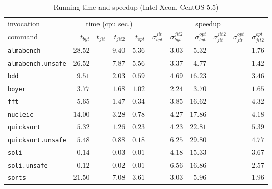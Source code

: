 \documentclass[12pt,a4paper,final]{article}
\begin{document}
\begin{table*}[h]
  \footnotesize
  \centering
  \begin{tabular}{l|rrrr|rrrrrr}
    \multicolumn{1}{l|}{\large invocation}
    & \multicolumn{4}{c|}{{\large time} (cpu sec.)}
    & \multicolumn{6}{c}{\large speedup}
    \\
    command
    & $t_{byt}$ & $t_{jit}$ & $t_{jit2}$ & $t_{opt}$
    & $\sigma^{jit}_{byt}$ & $\sigma^{jit2}_{byt}$ & $\sigma^{opt}_{byt}$
    & $\sigma^{jit2}_{jit}$ & $\sigma^{opt}_{jit}$ & $\sigma^{opt}_{jit2}$
    \\
    \hline
    \texttt{almabench} & $28.52$ &  & $9.40$ & $5.36$ &  & $3.03$ & $5.32$ &  &  & $1.76$\\
    \texttt{almabench.unsafe} & $26.52$ &  & $7.87$ & $5.56$ &  & $3.37$ & $4.77$ &  &  & $1.42$\\
    \texttt{bdd} & $9.51$ &  & $2.03$ & $0.59$ &  & $4.69$ & $16.23$ &  &  & $3.46$\\
    \texttt{boyer} & $3.77$ &  & $1.68$ & $1.02$ &  & $2.24$ & $3.70$ &  &  & $1.65$\\
    \texttt{fft} & $5.65$ &  & $1.47$ & $0.34$ &  & $3.85$ & $16.62$ &  &  & $4.32$\\
    \texttt{nucleic} & $14.00$ &  & $3.28$ & $0.78$ &  & $4.27$ & $17.86$ &  &  & $4.18$\\
    \texttt{quicksort} & $5.32$ &  & $1.26$ & $0.23$ &  & $4.23$ & $22.81$ &  &  & $5.39$\\
    \texttt{quicksort.unsafe} & $5.48$ &  & $0.88$ & $0.18$ &  & $6.25$ & $29.80$ &  &  & $4.77$\\
    \texttt{soli} & $0.14$ &  & $0.03$ & $0.01$ &  & $4.18$ & $15.33$ &  &  & $3.67$\\
    \texttt{soli.unsafe} & $0.12$ &  & $0.02$ & $0.01$ &  & $6.56$ & $16.86$ &  &  & $2.57$\\
    \texttt{sorts} & $21.50$ &  & $7.08$ & $3.61$ &  & $3.03$ & $5.96$ &  &  & $1.96$\\
  \end{tabular}
  \caption{Running time and speedup (Intel Xeon, CentOS 5.5)}
  \label{table:Running_time_and_speedup_Intel_Xeon}
\end{table*}
\end{document}
